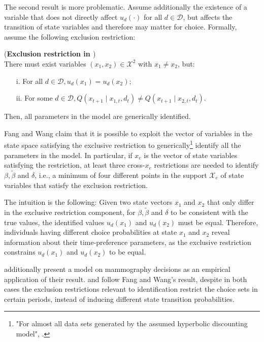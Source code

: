 The second result is more problematic. Assume additionally the existence of a variable that does not directly affect $u_d(\cdot)$ for all $d \in \mathcal{D}$, but affects the transition of state variables and therefore may matter for choice. Formally, assume the following exclusion restriction:

\begin{proposition} (\textbf{Exclusion restriction in \cite{FangWang2015}}) \label{def:res-fang-wang} \\
There must exist variables $(x_1, x_2) \in \mathcal{X}^2$ with $x_1 \neq x_2$, but:
\begin{enumerate}
\item[i.] For all $d \in \mathcal{D}, u_d(x_1) = u_d(x_2)$;
\item[ii.] For some $d \in \mathcal{D}, Q(x_{t+1} \mid x_{1,t}, d_t) \neq Q(x_{t+1} \mid x_{2,t}, d_t)$.
\end{enumerate}

\noindent Then, all parameters in the model are generically identified.
\end{proposition}

Fang and Wang claim that it is possible to exploit the vector of variables in the state space satisfying the exclusive restriction to generically\footnote{"For almost all data sets generated by the assumed hyperbolic discounting model", \textcite{FangWang2015}.} identify all the parameters in the model.
In particular, if $x_e$ is the vector of state variables satisfying the restriction, at least three cross-$x_e$ restrictions are needed to identify $\beta, \tilde{\beta}$ and $\delta$, i.e., a minimum of four different points in the support $\mathcal{X}_e$ of state variables that satisfy the exclusion restriction.

The intuition is the following: Given two state vectors $x_1$ and $x_2$ that only differ in the exclusive restriction component, for $\beta, \tilde{\beta}$ and $\delta$ to be consistent with the true values, the identified values $u_d(x_1)$ and $u_d(x_2)$ must be equal. Therefore, individuals having different choice probabilities at state $x_1$ and $x_2$ reveal information about their time-preference parameters, as the exclusive restriction constrains $u_d(x_1)$ and $u_d(x_2)$ to be equal.

\textcite{FangWang2015} additionally present a model on mammography decisions as an empirical application of their result. \textcite{Chan2017} and \textcite{Haan2020} follow Fang and Wang's result, despite in both cases the exclusion restrictions relevant to identification restrict the choice sets in certain periods, instead of inducing different state transition probabilities.

